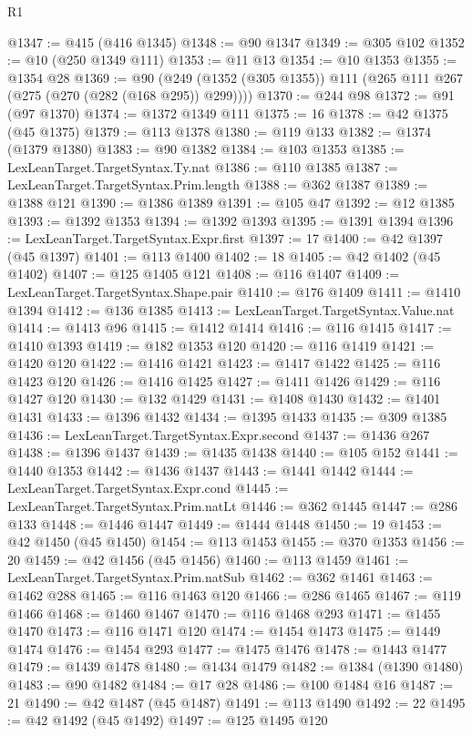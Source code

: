 \begin{lexlean}{R1}
\begin{coremodule}
@1347 := @415 (@416 @1345)
@1348 := @90 @1347
@1349 := @305 @102
@1352 := @10 (@250 @1349 @111)
@1353 := @11 @13
@1354 := @10 @1353
@1355 := @1354 @28
@1369 := @90 (@249 (@1352 (@305 @1355)) @111 (@265 @111 @267 (@275 (@270 (@282 (@168 @295)) @299))))
@1370 := @244 @98
@1372 := @91 (@97 @1370)
@1374 := @1372 @1349 @111
@1375 := 16
@1378 := @42 @1375 (@45 @1375)
@1379 := @113 @1378
@1380 := @119 @133
@1382 := @1374 (@1379 @1380)
@1383 := @90 @1382
@1384 := @103 @1353
@1385 := LexLeanTarget.TargetSyntax.Ty.nat
@1386 := @110 @1385
@1387 := LexLeanTarget.TargetSyntax.Prim.length
@1388 := @362 @1387
@1389 := @1388 @121
@1390 := @1386 @1389
@1391 := @105 @47
@1392 := @12 @1385
@1393 := @1392 @1353
@1394 := @1392 @1393
@1395 := @1391 @1394
@1396 := LexLeanTarget.TargetSyntax.Expr.first
@1397 := 17
@1400 := @42 @1397 (@45 @1397)
@1401 := @113 @1400
@1402 := 18
@1405 := @42 @1402 (@45 @1402)
@1407 := @125 @1405 @121
@1408 := @116 @1407
@1409 := LexLeanTarget.TargetSyntax.Shape.pair
@1410 := @176 @1409
@1411 := @1410 @1394
@1412 := @136 @1385
@1413 := LexLeanTarget.TargetSyntax.Value.nat
@1414 := @1413 @96
@1415 := @1412 @1414
@1416 := @116 @1415
@1417 := @1410 @1393
@1419 := @182 @1353 @120
@1420 := @116 @1419
@1421 := @1420 @120
@1422 := @1416 @1421
@1423 := @1417 @1422
@1425 := @116 @1423 @120
@1426 := @1416 @1425
@1427 := @1411 @1426
@1429 := @116 @1427 @120
@1430 := @132 @1429
@1431 := @1408 @1430
@1432 := @1401 @1431
@1433 := @1396 @1432
@1434 := @1395 @1433
@1435 := @309 @1385
@1436 := LexLeanTarget.TargetSyntax.Expr.second
@1437 := @1436 @267
@1438 := @1396 @1437
@1439 := @1435 @1438
@1440 := @105 @152
@1441 := @1440 @1353
@1442 := @1436 @1437
@1443 := @1441 @1442
@1444 := LexLeanTarget.TargetSyntax.Expr.cond
@1445 := LexLeanTarget.TargetSyntax.Prim.natLt
@1446 := @362 @1445
@1447 := @286 @133
@1448 := @1446 @1447
@1449 := @1444 @1448
@1450 := 19
@1453 := @42 @1450 (@45 @1450)
@1454 := @113 @1453
@1455 := @370 @1353
@1456 := 20
@1459 := @42 @1456 (@45 @1456)
@1460 := @113 @1459
@1461 := LexLeanTarget.TargetSyntax.Prim.natSub
@1462 := @362 @1461
@1463 := @1462 @288
@1465 := @116 @1463 @120
@1466 := @286 @1465
@1467 := @119 @1466
@1468 := @1460 @1467
@1470 := @116 @1468 @293
@1471 := @1455 @1470
@1473 := @116 @1471 @120
@1474 := @1454 @1473
@1475 := @1449 @1474
@1476 := @1454 @293
@1477 := @1475 @1476
@1478 := @1443 @1477
@1479 := @1439 @1478
@1480 := @1434 @1479
@1482 := @1384 (@1390 @1480)
@1483 := @90 @1482
@1484 := @17 @28
@1486 := @100 @1484 @16
@1487 := 21
@1490 := @42 @1487 (@45 @1487)
@1491 := @113 @1490
@1492 := 22
@1495 := @42 @1492 (@45 @1492)
@1497 := @125 @1495 @120

\end{coremodule}
\end{lexlean}
